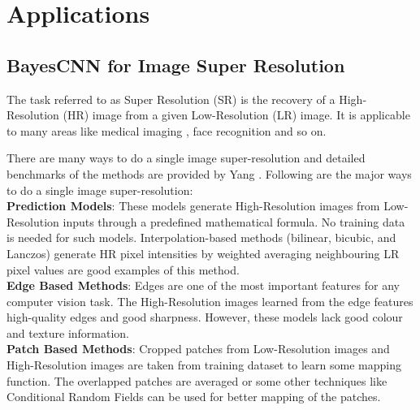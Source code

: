 \chapter{Applications}


\pagebreak



\section{BayesCNN for Image Super Resolution}

The task referred to as Super Resolution (SR) is the recovery of a High-Resolution (HR) image from a given Low-Resolution (LR) image. It is applicable to many areas like medical imaging \citet{10.1007/978-3-642-40760-4_2}, face recognition \citet{1203152} and so on.

There are many ways to do a single image super-resolution and detailed benchmarks of the methods are provided by Yang \citet{Yang2014SingleImageSA}. Following are the major ways to do a single image super-resolution:\\ 

\textbf{Prediction Models}: These models generate High-Resolution images
from Low-Resolution inputs through a predefined mathematical formula. No training data is needed for such models. Interpolation-based methods (bilinear, bicubic, and Lanczos) generate HR pixel intensities by weighted averaging neighbouring LR pixel values are good examples of this method.\\

\textbf{Edge Based Methods}: Edges are one of the most important features for any computer vision task. The High-Resolution images learned from the edge features high-quality edges and good sharpness. However, these models lack good colour and texture information.\\

\textbf{Patch Based Methods}: Cropped patches from Low-Resolution images and High-Resolution images are taken from training dataset to learn some mapping function. The overlapped patches are averaged or some other techniques like Conditional Random Fields \cite{lafferty2001conditional} can be used for better mapping of the patches.  


